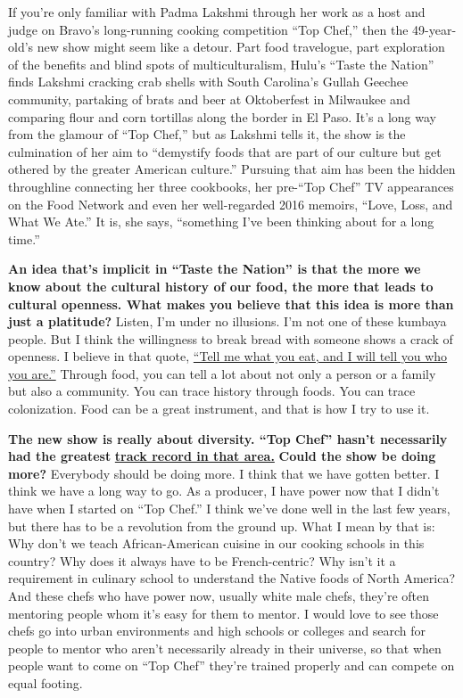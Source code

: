 If you're only familiar with Padma Lakshmi through her work as a host
and judge on Bravo's long-running cooking competition ``Top Chef,'' then
the 49-year-old's new show might seem like a detour. Part food
travelogue, part exploration of the benefits and blind spots of
multiculturalism, Hulu's ``Taste the Nation'' finds Lakshmi cracking
crab shells with South Carolina's Gullah Geechee community, partaking of
brats and beer at Oktoberfest in Milwaukee and comparing flour and corn
tortillas along the border in El Paso. It's a long way from the glamour
of ``Top Chef,'' but as Lakshmi tells it, the show is the culmination of
her aim to ``demystify foods that are part of our culture but get
othered by the greater American culture.'' Pursuing that aim has been
the hidden throughline connecting her three cookbooks, her pre-``Top
Chef'' TV appearances on the Food Network and even her well-regarded
2016 memoirs, ``Love, Loss, and What We Ate.'' It is, she says,
``something I've been thinking about for a long time.''

\textbf{An idea that's implicit in ``Taste the Nation'' is that the more
we know about the cultural history of our food, the more that leads to
cultural openness. What makes you believe that this idea is more than
just a platitude?} Listen, I'm under no illusions. I'm not one of these
kumbaya people. But I think the willingness to break bread with someone
shows a crack of openness. I believe in that quote,
\href{http://nytimes3xbfgragh.onion\#tooltip-1}{``Tell me what you eat,
and I will tell you who you are.''} Through food, you can tell a lot
about not only a person or a family but also a community. You can trace
history through foods. You can trace colonization. Food can be a great
instrument, and that is how I try to use it.

\textbf{The new show is really about diversity. ``Top Chef'' hasn't
necessarily had the greatest}
\textbf{\href{http://nytimes3xbfgragh.onion\#tooltip-2}{track record in
that area.}} \textbf{Could the show be doing more?} Everybody should be
doing more. I think that we have gotten better. I think we have a long
way to go. As a producer, I have power now that I didn't have when I
started on ``Top Chef.'' I think we've done well in the last few years,
but there has to be a revolution from the ground up. What I mean by that
is: Why don't we teach African-American cuisine in our cooking schools
in this country? Why does it always have to be French-centric? Why isn't
it a requirement in culinary school to understand the Native foods of
North America? And these chefs who have power now, usually white male
chefs, they're often mentoring people whom it's easy for them to mentor.
I would love to see those chefs go into urban environments and high
schools or colleges and search for people to mentor who aren't
necessarily already in their universe, so that when people want to come
on ``Top Chef'' they're trained properly and can compete on equal
footing.

